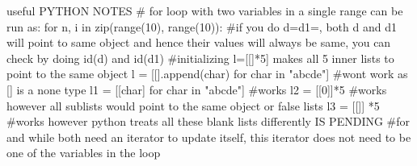 useful PYTHON NOTES
# for loop with two variables in a single range can be run as:
for n, i in zip(range(10), range(10)):
#if you do d=d1={}, both d and d1 will point to same object and hence their values will always be same, you can check by doing id(d) and id(d1)
#initializing l=[[]*5] makes all 5 inner lists to point to the same object
l = [[].append(char) for char in "abcde"] #wont work as [] is a none type
l1 = [[char] for char in "abcde"] #works
l2 = [[0]]*5 #works however all sublists would point to the same object or false lists
l3 = [[]] *5 #works however python treats all these blank lists differently IS PENDING    
#for and while both need an iterator to update itself, this iterator does not need to be one of the variables in the loop


